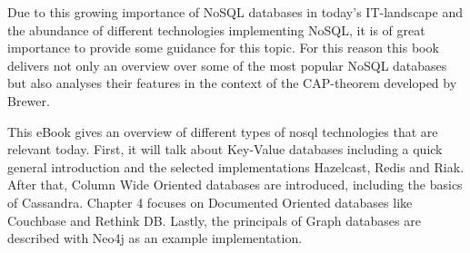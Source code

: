 Due to this growing importance of NoSQL databases in today's IT-landscape and
the abundance of different technologies implementing NoSQL, it is of great
importance to provide some guidance for this topic. For this reason this book
delivers not only an overview over some of the most popular NoSQL databases but
also analyses their features in the context of the CAP-theorem developed by
Brewer.

This eBook gives an overview of different types of \gls{nosql} technologies
that are relevant today. First, it will talk about Key-Value databases
including a quick general introduction and the selected implementations
Hazelcast, Redis and Riak. After that, Column Wide Oriented databases are
introduced, including the basics of Cassandra. Chapter 4 focuses on Documented
Oriented databases like Couchbase and Rethink DB. Lastly, the principals of
Graph databases are described with Neo4j as an example implementation. 


